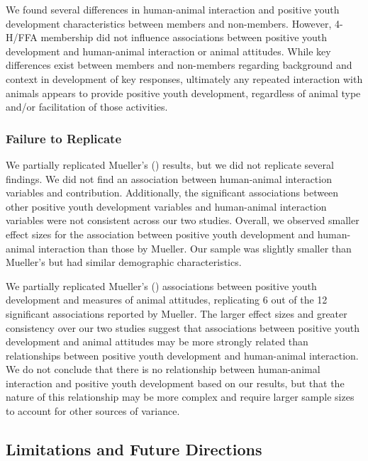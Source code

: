 \documentclass[
  jou,
  longtable,
  nolmodern,
  notxfonts,
  notimes,
  colorlinks=true,linkcolor=blue,citecolor=blue,urlcolor=blue]{apa7}
\begin{document}
We found several differences in human-animal interaction and positive
youth development characteristics between members and non-members.
However, 4-H/FFA membership did not influence associations between
positive youth development and human-animal interaction or animal
attitudes. While key differences exist between members and non-members
regarding background and context in development of key responses,
ultimately any repeated interaction with animals appears to provide
positive youth development, regardless of animal type and/or
facilitation of those activities.

\subsubsection{Failure to Replicate}\label{failure-to-replicate}

We partially replicated Mueller's ()
results, but we did not replicate several findings. We did not find an
association between human-animal interaction variables and contribution.
Additionally, the significant associations between other positive youth
development variables and human-animal interaction variables were not
consistent across our two studies. Overall, we observed smaller effect
sizes for the association between positive youth development and
human-animal interaction than those by Mueller. Our sample was slightly
smaller than Mueller's but had similar demographic characteristics.

We partially replicated Mueller's ()
associations between positive youth development and measures of animal
attitudes, replicating 6 out of the 12 significant associations reported
by Mueller. The larger effect sizes and greater consistency over our two
studies suggest that associations between positive youth development and
animal attitudes may be more strongly related than relationships between
positive youth development and human-animal interaction. We do not
conclude that there is no relationship between human-animal interaction
and positive youth development based on our results, but that the nature
of this relationship may be more complex and require larger sample sizes
to account for other sources of variance.

\subsection{Limitations and Future
Directions}\label{limitations-and-future-directions}
\end{document}
